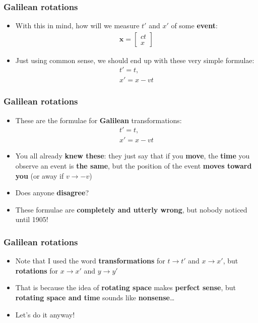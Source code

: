 \documentclass{beamer}
\begin{document}
\begin{frame}
  \frametitle{Galilean rotations}
  \begin{itemize}
    \item<1-> With this in mind, how will we measure $t'$ and $x'$ of some \textbf{event}:
      \begin{align*}
	\mathbf{x}=
	\begin{bmatrix}
	  ct\\
	  x
	\end{bmatrix}
      \end{align*}
    \item<2-> Just using common sense, we should end up with these very simple formulae:
      \begin{gather*}
	t'=t,\\
	x'=x-vt
      \end{gather*}
  \end{itemize}
\end{frame}

\begin{frame}
  \frametitle{Galilean rotations}
  \begin{itemize}
    \item<1-> These are the formulae for \textbf{Galilean} transformations:
      \begin{gather*}
	t'=t,\\
	x'=x-vt
      \end{gather*}
    \item<2-> You all already \textbf{knew these}: they just say that if you \textbf{move}, the \textbf{time} you observe an event is \textbf{the same}, but the position of the event \textbf{moves toward you} (or away if $v\to -v$)
    \item<3-> Does anyone \textbf{disagree}?
    \item<4-> These formulae are \textbf{completely and utterly wrong}, but nobody noticed until 1905!
  \end{itemize}
\end{frame}

\begin{frame}
  \frametitle{Galilean rotations}
  \begin{itemize}
    \item<1-> Note that I used the word \textbf{transformations} for $t\to t'$ and $x\to x'$, but \textbf{rotations} for $x\to x'$ and $y\to y'$
    \item<2-> That is because the idea of \textbf{rotating space} makes \textbf{perfect sense}, but \textbf{rotating space and time} sounds like \textbf{nonsense}\ldots
    \item<3-> Let's do it anyway!
  \end{itemize}
\end{frame}
\end{document}
